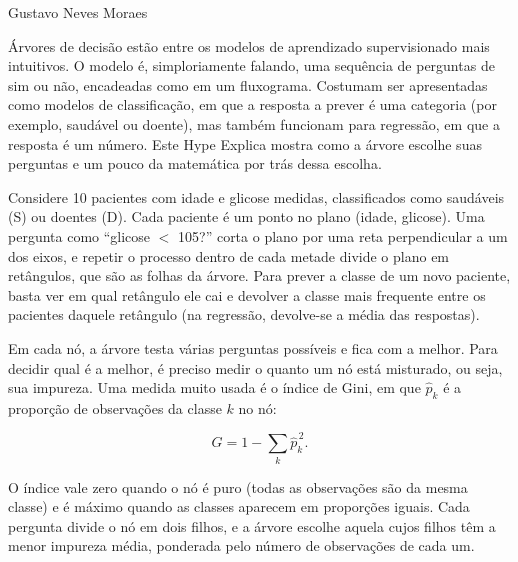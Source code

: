 {Gustavo Neves Moraes}
{

\hspace*{1.5em}
Árvores de decisão estão entre os modelos de aprendizado supervisionado mais intuitivos. 
O modelo é, simploriamente falando, uma sequência de perguntas de sim ou não,
encadeadas como em um fluxograma.
Costumam ser apresentadas como modelos de classificação,
em que a resposta a prever é uma categoria (por exemplo, saudável ou doente),
mas também funcionam para regressão, em que a resposta é um número.
Este Hype Explica mostra como a árvore escolhe suas perguntas
e um pouco da matemática por trás dessa escolha.

\subtitle{Uma árvore é uma partição do espaço}

\hspace*{1.5em}
Considere 10 pacientes com idade e glicose medidas, classificados como saudáveis (S) ou doentes (D).
Cada paciente é um ponto no plano (idade, glicose).
Uma pergunta como ``glicose $<$ 105?'' corta o plano por uma reta perpendicular a um dos eixos,
e repetir o processo dentro de cada metade divide o plano em retângulos, que são as folhas da árvore.
Para prever a classe de um novo paciente, basta ver em qual retângulo ele cai
e devolver a classe mais frequente entre os pacientes daquele retângulo
(na regressão, devolve-se a média das respostas).


\subtitle{Como a árvore escolhe a pergunta}

\hspace*{1.5em}
Em cada nó, a árvore testa várias perguntas possíveis e fica com a melhor.
Para decidir qual é a melhor, é preciso medir o quanto um nó está misturado, ou seja, sua impureza.
Uma medida muito usada é o índice de Gini,
em que $\hat{p}_k$ é a proporção de observações da classe $k$ no nó:

\[
G = 1 - \sum_{k} \hat{p}_{k}^{\,2}.
\]

\hspace*{1.5em}
O índice vale zero quando o nó é puro (todas as observações são da mesma classe)
e é máximo quando as classes aparecem em proporções iguais.
Cada pergunta divide o nó em dois filhos,
e a árvore escolhe aquela cujos filhos têm a menor impureza média,
ponderada pelo número de observações de cada um.

}
